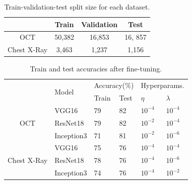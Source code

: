 \begin{table}[ht]
\begin{tabular}{cccc}
 & Train & Validation & Test \\ \hline
\hline
OCT & 50,382 & 16,853 & 16, 857 \\ \hline
Chest X-Ray & 3,463 & 1,237 & 1,156 \\ \hline
\end{tabular}
\caption{Train-validation-test split size for each dataset.}
\vspace{-6mm}
\label{tbl:dataset_sizes}
\end{table}

\begin{table}[ht]
\begin{tabular}{|c|l|l|l|l|l|l|}
\hline
\multicolumn{1}{|l|}{\multirow{3}{*}{}} & \multirow{3}{*}{Model} & \multicolumn{2}{l|}{\multirow{2}{*}{Accuracy(\%)}} & \multicolumn{3}{l|}{\multirow{2}{*}{Hyperparams.}} \\
\multicolumn{1}{|l|}{} &  & \multicolumn{2}{l|}{} & \multicolumn{3}{l|}{} \\ \cline{3-7} 
\multicolumn{1}{|l|}{} &  & Train & Test & \multicolumn{2}{l|}{$\eta$} & $\lambda$ \\ \hline
\multirow{3}{*}{OCT} & VGG16 & 79 & 82 & \multicolumn{2}{l|}{$10^{-4}$} & $10^{-4}$ \\ \cline{2-7} 
 & ResNet18 & 79 & 82 & \multicolumn{2}{l|}{$10^{-2}$} & $10^{-4}$ \\ \cline{2-7} 
 & Inception3 & 71 & 81 & \multicolumn{2}{l|}{$10^{-2}$} & $10^{-6}$ \\ \hline
\multirow{3}{*}{Chest X-Ray} & VGG16 & 75 & 76 & \multicolumn{2}{l|}{$10^{-4}$} & $10^{-4}$ \\ \cline{2-7} 
 & ResNet18 & 78 & 76 & \multicolumn{2}{l|}{$10^{-4}$} & $10^{-6}$ \\ \cline{2-7} 
 & Inception3 & 74 & 76 & \multicolumn{2}{l|}{$10^{-4}$} & $10^{-2}$ \\ \hline
\end{tabular}
\caption{Train and test accuracies after fine-tuning.}
\vspace{-6mm}
\label{tbl:finetune_accuracies}
\end{table}

